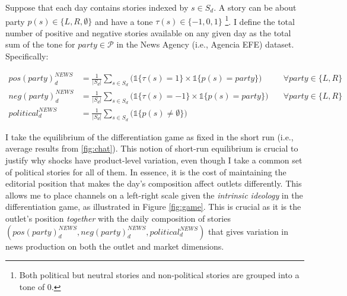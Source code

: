 \documentclass[12pt]{article}
\begin{document}
	Suppose that each day contains stories indexed by $ s \in S_d $. A story can be about party $ p(s) \in \{L, R, \emptyset\} $ and have a tone $ \tau(s) \in \{-1, 0, 1\} $ \footnote{Both political but neutral stories and non-political stories are grouped into a tone of 0.}. I define the total number of positive and negative stories available on any given day as the total sum of the tone for $ party \in \mathcal{P}  $ in the News Agency (i.e., Agencia EFE) dataset. Specifically:
	
	
	\begin{equation}\label{eq:first_stage}
		\begin{aligned}
			pos(party)_d^{NEWS}&= \frac{1}{|S_d|} \sum_{s \in S_d}\bigg(\mathds{1}\{\tau(s)=1\} \times \mathds{1}\{p(s)=party\} \bigg)\quad &\forall party \in \{L,R\}\\
			neg(party)_d^{NEWS}&= \frac{1}{|S_d|}\sum_{s \in S_d}\bigg( \mathds{1}\{\tau(s)=-1\} \times \mathds{1}\{p(s)=party\} \bigg) \quad &\forall party \in \{L,R\}\\
			political_d^{NEWS}&=\frac{1}{|S_d|} \sum_{s \in S_d}\bigg(  \mathds{1}\{p(s)\neq\emptyset\} \bigg)
		\end{aligned}
	\end{equation} 
	
	
	I take the equilibrium of the differentiation game as fixed in the short run (i.e., average results from \ref{fig:chat}). This notion of short-run equilibrium is crucial to justify why shocks have product-level variation, even though I take a common set of political stories for all of them. In essence, it is the cost of maintaining the editorial position that makes the day's composition affect outlets differently. This allows  me to place channels on a left-right scale given the \textit{intrinsic ideology} in the differentiation game, as illustrated in Figure \ref{fig:game}. This is crucial as it is the outlet's position \textit{together} with the daily composition of stories $ (pos(party)_d^{NEWS},neg(party)_d^{NEWS}, political_d^{NEWS}) $ that gives variation in news production on both the outlet and market dimensions. 
	
\end{document}
